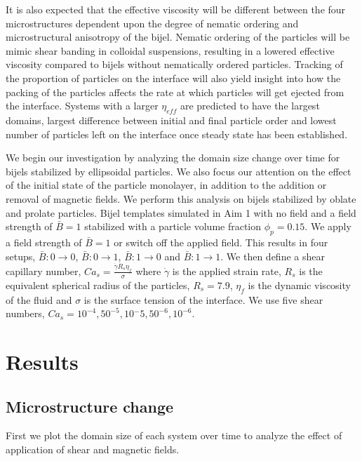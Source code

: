 It is also expected that the effective viscosity will be different between the four microstructures dependent upon the 
degree of nematic ordering and microstructural anisotropy of the bijel. Nematic ordering of the particles will be mimic 
shear banding in colloidal suspensions, resulting in a lowered effective viscosity compared to bijels without nematically 
ordered particles. \cite{xu_relation_2013, vermant_flow-induced_2005} Tracking of the proportion of particles on the 
interface will also yield insight into how the packing of the particles affects the rate at which particles will get 
ejected from the interface. Systems with a larger $\eta_{eff}$ are predicted to have the largest domains, largest 
difference between initial and final particle order and lowest number of particles left on the interface once steady 
state has been established. 

We begin our investigation by analyzing the domain size change over time for bijels stabilized by ellipsoidal particles. We also
focus our attention on the effect of the initial state of the particle monolayer, in addition to the addition or removal of magnetic
fields. We perform this analysis on bijels stabilized by oblate and prolate particles. Bijel templates simulated in Aim 1 with no
field and a field strength of $\bar{B} = 1$ stabilized with a particle volume fraction $\phi_p = 0.15$. We apply a field strength of
$\bar{B} = 1$ or switch off the applied field. This results in four setups, $\bar{B}:0\rightarrow 0$, $\bar{B}:0\rightarrow 1$,
$\bar{B}:1\rightarrow 0$ and $\bar{B}:1\rightarrow 1$. We then define a shear capillary number, 
$Ca_s = \frac{\dot{\gamma} R_{s} \eta_{f}}{\sigma}$ where $\dot{\gamma}$ is the applied strain rate, $R_s$ is the equivalent
spherical radius of the particles, $R_s = 7.9$, $\eta_f$ is the dynamic viscosity of the fluid and $\sigma$ is the surface tension
of the interface. We use five shear numbers, $Ca_s = 10^{-4}, 50^{-5}, 10{^-5}, 50^{-6}, 10^{-6}$.

\section{Results}\label{sec:results_p3}
\subsection{Microstructure change}

First we plot the domain size of each system over time to analyze the effect of application of shear and magnetic fields.

